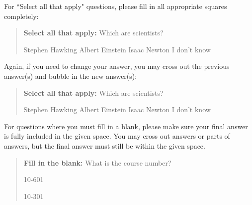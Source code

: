 \documentclass[11pt,addpoints,answers]{exam}
\begin{document}
For ``Select all that apply" questions, please fill in all appropriate squares completely:

\begin{quote}
\textbf{Select all that apply:} Which are scientists?
    {%
    \checkboxchar{$\Box$} \checkedchar{$\blacksquare$} %
    \begin{checkboxes}
    \CorrectChoice Stephen Hawking 
    \CorrectChoice Albert Einstein
    \CorrectChoice Isaac Newton
    \choice I don't know
    \end{checkboxes}
    }
\end{quote}

Again, if you need to change your answer, you may cross out the previous answer(s) and bubble in the new answer(s):

\begin{quote}
\textbf{Select all that apply:} Which are scientists?
    {%
    \checkboxchar{\xcancel{$\blacksquare$}} \checkedchar{$\blacksquare$} %
    \begin{checkboxes}
    \CorrectChoice Stephen Hawking 
    \CorrectChoice Albert Einstein
    \CorrectChoice Isaac Newton
    \choice I don't know
    \end{checkboxes}
    }
\end{quote}

For questions where you must fill in a blank, please make sure your final answer is fully included in the given space. You may cross out answers or parts of answers, but the final answer must still be within the given space.

\begin{quote}
\textbf{Fill in the blank:} What is the course number?

\begin{tcolorbox}[fit,height=1cm, width=4cm, blank, borderline={1pt}{-2pt},nobeforeafter]
    \begin{center}\huge10-601\end{center}
    \end{tcolorbox}\hspace{2cm}
    \begin{tcolorbox}[fit,height=1cm, width=4cm, blank, borderline={1pt}{-2pt},nobeforeafter]
    \begin{center}\huge10-301\end{center}
    \end{tcolorbox}
\end{quote}
\clearpage
\end{document}
